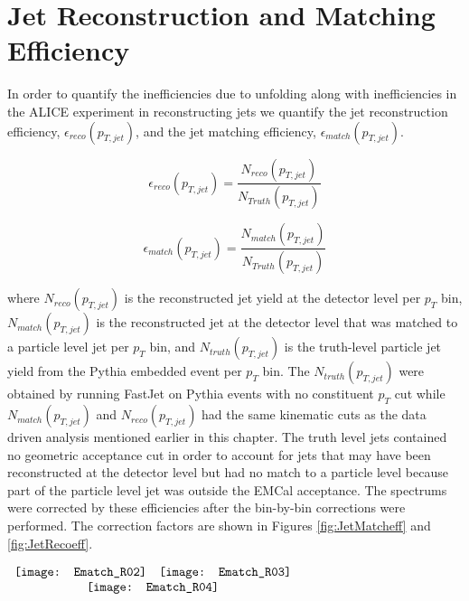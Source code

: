 \section{Jet Reconstruction and Matching Efficiency}
In order to quantify the inefficiencies due to unfolding along with inefficiencies in the ALICE experiment in reconstructing jets we quantify the jet reconstruction efficiency, $\epsilon_{reco} (p_{T, jet})$, and the jet matching efficiency, $\epsilon_{match} (p_{T, jet})$.

\begin{equation}
 \epsilon_{reco} (p_{T, jet}) = \frac{N_{reco}(p_{T, jet}) }{N_{Truth} (p_{T, jet})}
\label{eq:jetrecoeff}
\end{equation}

\begin{equation}
 \epsilon_{match} (p_{T, jet}) = \frac{N_{match}(p_{T, jet}) }{N_{Truth}(p_{T, jet})}
\label{eq:jetmatchoeff}
\end{equation}

\noindent 
where $N_{reco} (p_{T, jet})$ is the reconstructed jet yield at the detector level per $p_{T}$ bin, $N_{match}(p_{T, jet})$ is the reconstructed jet at the detector level that was matched to a particle level jet per $p_{T}$ bin, and $N_{truth} (p_{T, jet})$ is the truth-level particle jet yield from the Pythia embedded event per $p_{T}$ bin.  The $N_{truth} (p_{T, jet})$ were obtained by running FastJet on Pythia events with no constituent $p_{T}$ cut while $N_{match}(p_{T, jet})$ and $N_{reco} (p_{T, jet})$ had the same kinematic cuts as the data driven analysis mentioned earlier in this chapter.  The truth level jets contained no geometric acceptance cut in order to account for jets that may have been reconstructed at the detector level but had no match to a particle level because part of the particle level jet was outside the EMCal acceptance.  The spectrums were corrected by these efficiencies after the bin-by-bin corrections were performed.  The correction factors are shown in Figures \ref{fig:JetMatcheff} and \ref{fig:JetRecoeff}.

\begin{figure*}[t!]
$\begin{array}{rl}
    \texttt{[image: Ematch\_R02]} &
    \texttt{[image: Ematch\_R03]}\\
    \multicolumn{2}{c}{\texttt{[image: Ematch\_R04]}}
\end{array}$
\caption[Jet reconstruction efficiency for jets between R = 0.2 and R = 0.4. ]{\label{fig:JetMatcheff}Jet matching efficiency for jets between R = 0.2 and R = 0.4.}
\end{figure*}

